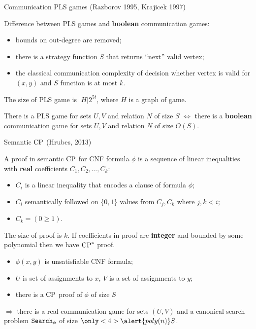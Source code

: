 \begin{frame}{Communication PLS games (Razborov 1995, Krajicek 1997)}

    Difference between PLS games and \textbf{boolean} communication games:
    \begin{itemize}
        \item bounds on out-degree are removed;
        \item there is a strategy function $S$ that returns ``next'' valid vertex;
        \item the classical communication complexity of decision whether vertex is valid for $(x, y)$ and $S$ function is at
            most $k$.
    \end{itemize}

    The size of PLS game is $|H| 2^{5 t}$, where $H$ is a graph of game.

    \pause

    \begin{theorem}[S 2016, unp.]
        There is a PLS game for sets $U, V$ and relation $N$ of size $S$ $\Leftrightarrow$ there is a \textbf{boolean}
        communication game for sets $U, V$ and relation $N$ of size $O(S)$.
    \end{theorem}

\end{frame}


\begin{frame}{Semantic $\mathrm{CP}$ (Hrubes, 2013)}

    A proof in semantic $\mathrm{CP}$ for CNF formula $\phi$ is a sequence of linear inequalities with \textbf{real} coefficients
    $C_1, C_2, \dots, C_k$:
    \begin{itemize}
        \item $C_i$ is a linear inequality that encodes a clause of formula $\phi$;
        \item $C_i$ semantically followed on $\{0, 1\}$ values from $C_j, C_k$ where $j, k < i$;
        \item $C_k = (0 \ge 1)$.
    \end{itemize}

    \pause
    The size of proof is $k$. If coefficients in proof are \textbf{integer} and bounded by some polynomial then we have
    $\mathrm{CP}^*$ proof.

    \pause

    \begin{lemma}[S 2016, unp.]
        \begin{itemize}
            \item $\phi(x, y)$ is unsatisfiable CNF formula;
            \item $U$ is set of assignments to $x$, $V$ is a set of assignments to $y$;
            \item there is a $\mathrm{CP}$  proof of $\phi$ of size $S$
        \end{itemize}
        $\Rightarrow$ there is a real  communication game for sets $(U, V)$ and a canonical search
        problem $\mathtt{Search}_{\phi}$ of size $\only<4>{\alert{poly(n)}} S$.
    \end{lemma}

\end{frame}

